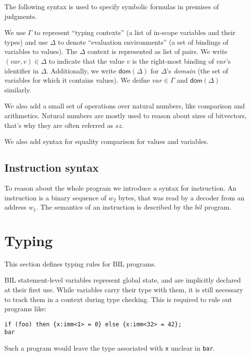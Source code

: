 \documentclass[11pt]{article}
\begin{document}
The following syntax is used to specify symbolic formulas in premises
of judgments.

We use $\Gamma$ to represent ``typing contexts'' (a list of in-scope
variables and their types) and use $\Delta$ to denote ``evaluation
environments'' (a set of bindings of variables to values). The $\Delta$
context is represented as list of
pairs. We write $(var,v) \in \Delta$ to indicate that the value $v$ is
the right-most binding of $var$'s identifier in $\Delta$.  Additionally, we write
$\mathsf{dom}(\Delta)$ for $\Delta$'s {\em domain} (the set of
variables for which it contains values).  We deifne $var \in \Gamma$
and $\mathsf{dom}(\Delta)$ similarly.

We also add a small set of operations over natural numbers, like
comparison and arithmetics. Natural numbers are mostly used to reason
about sizes of bitvectors, that's why they are often referred as
$\mathit{sz}$.

We also add syntax for equality comparison for values and variables.


\ottgrammartabular{
\ottgamma\ottinterrule
\ottdelta\ottinterrule
}

\ottgrammartabular{
\ottformula\ottinterrule
}

\ottgrammartabular{
\ottnat\ottinterrule
}

\subsection{Instruction syntax}
\label{sec:insn}

To reason about the whole program we introduce a syntax for
instruction. An instruction is a binary sequence of $\mathit{w_2}$
bytes, that was read by a decoder from an address $\mathit{w_1}$. The
semantics of an instruction is described by the $\mathit{bil}$ program.

\ottgrammartabular{
\ottinsn\ottinterrule
}

\clearpage

\section{Typing}
\label{sec:typing}

This section defines typing rules for BIL programs.

BIL statement-level variables represent global state, and are
implicitly declared at their first use.  While variables carry their
type with them, it is still necessary to track them in a context
during type checking.  This is required to rule out programs like:
\begin{verbatim}
if (foo) then {x:imm<1> = 0} else {x:imm<32> = 42};
bar
\end{verbatim}
Such a program would leave the type associated with {\tt x} unclear in
{\tt bar}.
\end{document}
